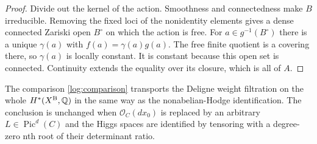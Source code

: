 \begin{proof}
Divide out the kernel of the action.  Smoothness and connectedness
make $B$ irreducible.  Removing the fixed loci of the nonidentity
elements gives a dense connected Zariski open $B^\circ$ on which
the action is free.  For $a\in g^{-1}(B^\circ)$ there is a unique
$\gamma(a)$ with $f(a)=\gamma(a)g(a)$.  The free finite quotient
is a covering there, so $\gamma(a)$ is locally constant.  It is
constant because this open set is connected.  Continuity extends
the equality over its closure, which is all of $A$.
\end{proof}

\begin{proposition}
\label{log:nah}
The comparison \eqref{log:comparison} transports the Deligne weight
filtration on the whole $H^*(X^{\rm B},\mathbb Q)$ in the same way as
the nonabelian-Hodge identification.  The conclusion is unchanged
when $\mathcal O_C(d x_0)$ is replaced by an arbitrary
$L\in\operatorname{Pic}^d(C)$ and the Higgs spaces are identified by
tensoring with a degree-zero nth root of their determinant ratio.
\end{proposition}

